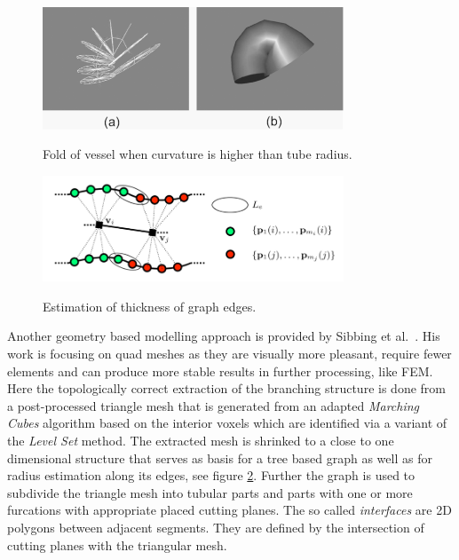 \begin{figure}[h]
	\centering
	\includegraphics[width=0.8\textwidth]{./Images/Fold_of_vessel.png} \\
	\caption{Fold of vessel when curvature is higher than tube radius.}
	\cite{volkau2005geometric}
	\label{fig:Fold_of_vessel}
\end{figure}

\begin{figure}[h]
	\centering
	\includegraphics[width=0.8\textwidth]{./Images/Estimate_thickness.png} \\
	\caption{Estimation of thickness of graph edges.}
	\cite{sibbing2012topology}
	\label{fig:Estimate_thickness}
\end{figure}

Another geometry based modelling approach is provided by Sibbing et al.~\cite{sibbing2012topology}.
His work is focusing on quad meshes as they are visually more pleasant, require fewer elements and can produce more stable results in further processing, like FEM. Here the topologically correct extraction of the branching structure is done from a post-processed triangle mesh that is generated from an adapted \emph{Marching Cubes} algorithm based on the interior voxels which are identified via a variant of the \emph{Level Set} method. The extracted mesh is shrinked to a close to one dimensional structure that serves as basis for a tree based graph as well as for radius estimation along its edges, see figure \ref{fig:Estimate_thickness}. Further the graph is used to subdivide the triangle mesh into tubular parts and parts with one or more furcations with appropriate placed cutting planes. The so called \emph{interfaces} are 2D polygons between adjacent segments. They are defined by the intersection of cutting planes with the triangular mesh. 

